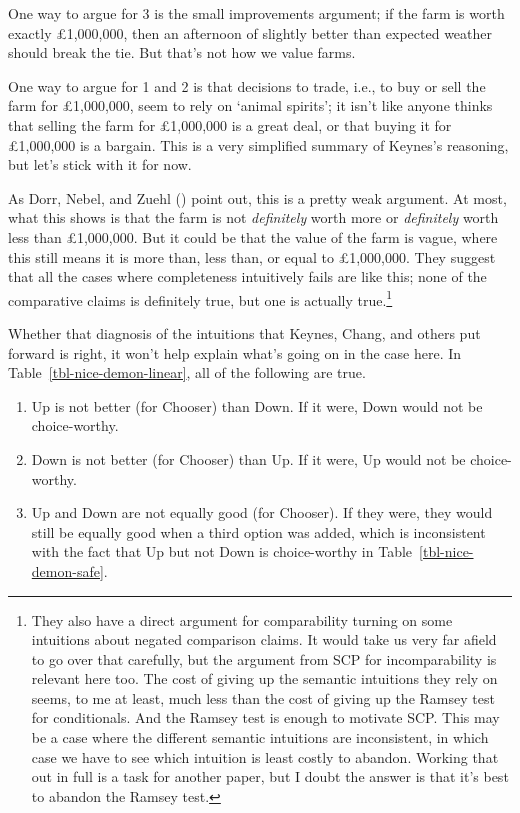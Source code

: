 \documentclass[
  10pt,
  letterpaper,
  DIV=11,
  numbers=noendperiod,
  twoside]{scrartcl}
\providecommand{\tightlist}{%
  \setlength{\itemsep}{0pt}\setlength{\parskip}{0pt}}\usepackage{longtable,booktabs,array}
\begin{document}
One way to argue for 3 is the small improvements argument; if the farm
is worth exactly £1,000,000, then an afternoon of slightly better than
expected weather should break the tie. But that's not how we value
farms.

One way to argue for 1 and 2 is that decisions to trade, i.e., to buy or
sell the farm for £1,000,000, seem to rely on `animal spirits'; it isn't
like anyone thinks that selling the farm for £1,000,000 is a great deal,
or that buying it for £1,000,000 is a bargain. This is a very simplified
summary of Keynes's reasoning, but let's stick with it for now.

As Dorr, Nebel, and Zuehl ()
point out, this is a pretty weak argument. At most, what this shows is
that the farm is not \emph{definitely} worth more or \emph{definitely}
worth less than £1,000,000. But it could be that the value of the farm
is vague, where this still means it is more than, less than, or equal to
£1,000,000. They suggest that all the cases where completeness
intuitively fails are like this; none of the comparative claims is
definitely true, but one is actually true.\footnote{They also have a
  direct argument for comparability turning on some intuitions about
  negated comparison claims. It would take us very far afield to go over
  that carefully, but the argument from SCP for incomparability is
  relevant here too. The cost of giving up the semantic intuitions they
  rely on seems, to me at least, much less than the cost of giving up
  the Ramsey test for conditionals. And the Ramsey test is enough to
  motivate SCP. This may be a case where the different semantic
  intuitions are inconsistent, in which case we have to see which
  intuition is least costly to abandon. Working that out in full is a
  task for another paper, but I doubt the answer is that it's best to
  abandon the Ramsey test.}

Whether that diagnosis of the intuitions that Keynes, Chang, and others
put forward is right, it won't help explain what's going on in the case
here. In Table~\ref{tbl-nice-demon-linear}, all of the following are
true.

\begin{enumerate}
\def\labelenumi{\arabic{enumi}.}
\tightlist
\item
  Up is not better (for Chooser) than Down. If it were, Down would not
  be choice-worthy.
\item
  Down is not better (for Chooser) than Up. If it were, Up would not be
  choice-worthy.
\item
  Up and Down are not equally good (for Chooser). If they were, they
  would still be equally good when a third option was added, which is
  inconsistent with the fact that Up but not Down is choice-worthy in
  Table~\ref{tbl-nice-demon-safe}.
\end{enumerate}
\end{document}
